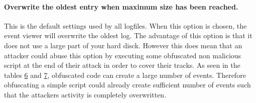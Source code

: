 \documentclass{article}%
\begin{document}
\paragraph{Overwrite the oldest entry when maximum size has been reached.}\hfill
\newline
This is the default settings used by all logfiles. When this option is chosen, the event viewer will overwrite the oldest log. The advantage of this option is that it does not use a large part of your hard disck. However this does mean that an attacker could abuse this option by executing some obfuscated non malicious script at the end of their attack in order to cover their tracks. As seen in the tables \hyperlink{table6}{6} and \hyperlink{table7}{7}, obfuscated code can create a large number of events. Therefore obfuscating a simple script could already create sufficient number of events such that the attackers activity is completely overwritten. 
\newpage
\end{document}
